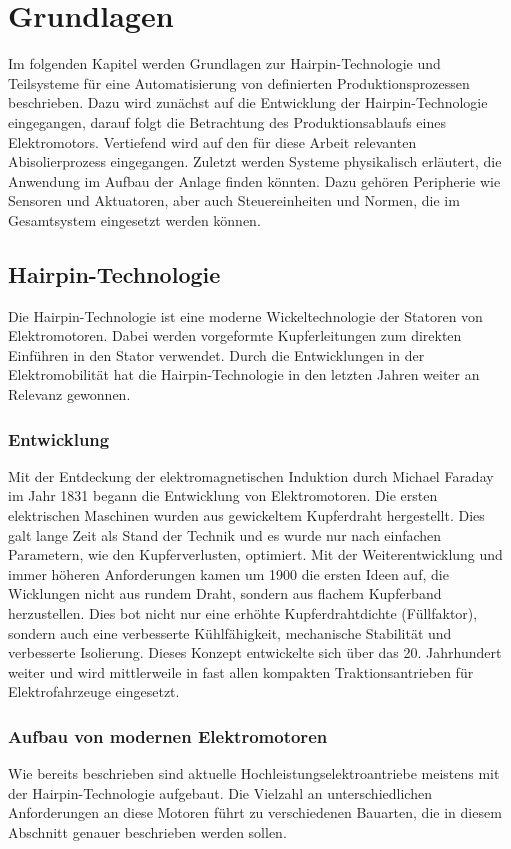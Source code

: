 \section{Grundlagen}\label{sec:Grundlagen}
Im folgenden Kapitel werden Grundlagen zur Hairpin-Technologie und Teilsysteme für eine Automatisierung von definierten Produktionsprozessen beschrieben.
Dazu wird zunächst auf die Entwicklung der Hairpin-Technologie eingegangen, darauf folgt die Betrachtung des Produktionsablaufs
eines Elektromotors. Vertiefend wird auf den für diese Arbeit relevanten Abisolierprozess eingegangen. Zuletzt werden Systeme physikalisch
erläutert, die Anwendung im Aufbau der Anlage finden könnten. Dazu gehören Peripherie wie Sensoren und Aktuatoren, aber auch Steuereinheiten
und Normen, die im Gesamtsystem eingesetzt werden können.
%
%
\subsection{Hairpin-Technologie}\label{sec:HairPinTechnologie}
Die Hairpin-Technologie ist eine moderne Wickeltechnologie der Statoren von Elektromotoren. Dabei werden vorgeformte Kupferleitungen
zum direkten Einführen in den Stator verwendet. Durch die Entwicklungen in der Elektromobilität hat die Hairpin-Technologie in den
letzten Jahren weiter an Relevanz gewonnen.
%
\subsubsection{Entwicklung}\label{sec:EntwicklungHairPin}
Mit der Entdeckung der elektromagnetischen Induktion durch Michael Faraday im Jahr 1831 begann die Entwicklung von Elektromotoren.
Die ersten elektrischen Maschinen wurden aus gewickeltem Kupferdraht hergestellt. Dies galt lange Zeit als Stand der Technik und
es wurde nur nach einfachen Parametern, wie den Kupferverlusten, optimiert. Mit der Weiterentwicklung und immer höheren Anforderungen
kamen um 1900 die ersten Ideen auf, die Wicklungen nicht aus rundem Draht, sondern aus flachem Kupferband herzustellen. Dies bot nicht nur
eine erhöhte Kupferdrahtdichte (Füllfaktor), sondern auch eine verbesserte Kühlfähigkeit, mechanische Stabilität und verbesserte Isolierung.
Dieses Konzept entwickelte sich über das 20. Jahrhundert weiter und wird mittlerweile in fast allen kompakten Traktionsantrieben für Elektrofahrzeuge eingesetzt.
%
\subsubsection{Aufbau von modernen Elektromotoren}\label{sec:AufbauElektromotoren}
Wie bereits beschrieben sind aktuelle Hochleistungselektroantriebe meistens mit der Hairpin-Technologie aufgebaut.
Die Vielzahl an unterschiedlichen Anforderungen an diese Motoren führt zu verschiedenen Bauarten, die in diesem Abschnitt genauer beschrieben werden sollen.

